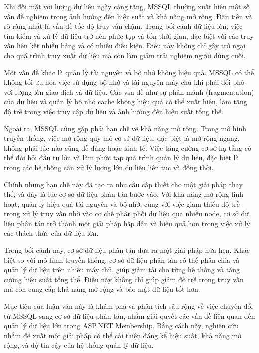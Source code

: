 \documentclass[14pt]{article}
\begin{document}
Khi đối mặt với lượng dữ liệu ngày càng tăng, MSSQL thường xuất hiện một số vấn đề nghiêm trọng ảnh hưởng đến hiệu suất và khả năng mở rộng. Đầu tiên và rõ ràng nhất là vấn đề tốc độ truy vấn chậm. Trong bối cảnh dữ liệu lớn, việc tìm kiếm và xử lý dữ liệu trở nên phức tạp và tốn thời gian, đặc biệt với các truy vấn liên kết nhiều bảng và có nhiều điều kiện. Điều này không chỉ gây trở ngại cho quá trình truy xuất dữ liệu mà còn làm giảm trải nghiệm người dùng cuối.

Một vấn đề khác là quản lý tài nguyên và bộ nhớ không hiệu quả. MSSQL có thể không tối ưu hóa việc sử dụng bộ nhớ và tài nguyên máy chủ khi phải đối phó với lượng lớn giao dịch và dữ liệu. Các vấn đề như sự phân mảnh (fragmentation) của dữ liệu và quản lý bộ nhớ cache không hiệu quả có thể xuất hiện, làm tăng độ trễ trong việc truy cập dữ liệu và ảnh hưởng đến hiệu suất tổng thể.

Ngoài ra, MSSQL cũng gặp phải hạn chế về khả năng mở rộng. Trong mô hình truyền thống, việc mở rộng quy mô cơ sở dữ liệu, đặc biệt là mở rộng ngang, không phải lúc nào cũng dễ dàng hoặc kinh tế. Việc tăng cường cơ sở hạ tầng có thể đòi hỏi đầu tư lớn và làm phức tạp quá trình quản lý dữ liệu, đặc biệt là trong các hệ thống cần xử lý lượng lớn dữ liệu liên tục và đồng thời.

Chính những hạn chế này đã tạo ra nhu cầu cấp thiết cho một giải pháp thay thế, và đây là lúc cơ sở dữ liệu phân tán bước vào. Với khả năng mở rộng linh hoạt, quản lý hiệu quả tài nguyên và bộ nhớ, cùng với việc giảm thiểu độ trễ trong xử lý truy vấn nhờ vào cơ chế phân phối dữ liệu qua nhiều node, cơ sở dữ liệu phân tán trở thành một giải pháp hấp dẫn và hiệu quả hơn trong việc xử lý các thách thức của dữ liệu lớn.

Trong bối cảnh này, cơ sở dữ liệu phân tán đưa ra một giải pháp hứa hẹn. Khác biệt so với mô hình truyền thống, cơ sở dữ liệu phân tán có thể phân chia và quản lý dữ liệu trên nhiều máy chủ, giúp giảm tải cho từng hệ thống và tăng cường hiệu suất tổng thể. Điều này không chỉ giúp giảm độ trễ trong truy vấn mà còn cung cấp khả năng mở rộng và bảo mật dữ liệu tốt hơn.

Mục tiêu của luận văn này là khám phá và phân tích sâu rộng về việc chuyển đổi từ MSSQL sang cơ sở dữ liệu phân tán, nhằm giải quyết các vấn đề liên quan đến quản lý dữ liệu lớn trong ASP.NET Membership. Bằng cách này, nghiên cứu nhằm đề xuất một giải pháp có thể cải thiện đáng kể hiệu suất, khả năng mở rộng, và độ tin cậy của hệ thống quản lý dữ liệu.
\end{document}
